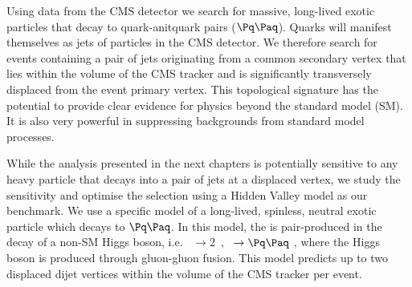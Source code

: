 Using data from the CMS detector we search for massive, long-lived exotic particles \X that decay
to quark-anitquark pairs ($\qq$). Quarks will manifest themselves as jets of particles in the 
CMS detector.
We therefore search for events
containing a pair of jets originating from a common secondary
vertex that lies within the volume of the CMS tracker and is significantly transversely displaced from the event
 primary vertex.
This topological signature has the potential to provide clear evidence for
physics beyond the standard model (SM). It is also very powerful in suppressing backgrounds from
standard model processes.

While the analysis presented in the next chapters is potentially sensitive 
to any heavy particle that decays into a pair of jets
 at a displaced vertex, we study the sensitivity and optimise the selection using a Hidden Valley
model as our benchmark. We use a specific model of a long-lived, spinless, neutral
exotic particle \X which decays to $\qq$. In this
model, the \X is pair-produced in the decay of a non-SM Higgs boson, i.e.  \Higgs~$\to
2$\X~, \X~$\to \qq$ \cite{Strassler:2006ri}, where the Higgs boson is produced through gluon-gluon
fusion. This model predicts up to two displaced
dijet vertices within the volume of the CMS tracker per event.




